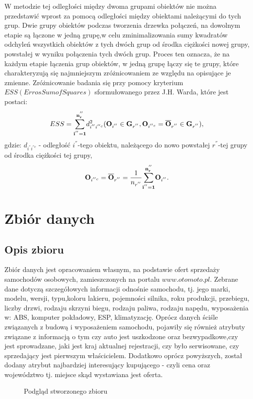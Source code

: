 \documentclass[12pt,a4paper]{report}
\begin{document}
W metodzie tej odległości między dwoma grupami obiektów nie można przedstawić wprost za pomocą odległości między obiektami należącymi do tych grup. Dwie grupy obiektów podczas tworzenia drzewka połączeń, na dowolnym etapie są łączone w jedną grupę,w celu zminimalizowania sumy kwadratów odchyleń wszystkich obiektów z tych dwóch grup od środka ciężkości nowej grupy, powstałej w wyniku połączenia tych dwóch grup. Proces ten oznacza, że na każdym etapie łączenia grup obiektów, w jedną grupę łączy się te grupy, które charakteryzują się najmniejszym zróżnicowaniem ze względu na opisujące je zmienne. Zróżnicowanie badania się przy pomocy kryterium $ESS (Erros Sum of Squares)$ sformułowanego przez J.H. Warda, które jest postaci:
\begin{equation}
ESS= \bold{\sum_{i^{''}=1}^{n_r^{''}}} d_{i^{''}i^{''c}}^2 ( \bold{O}_{i^{''}} \in \bold{G}_{r^{''}}, \bold{O}_{i^{''c}}=\bold{\overline{O}}_{r^{''}} \in \bold{G}_{r^{''}} ),
\end{equation} 
gdzie:
$d_{i^{''}i^{''c}}$ - odległość $i^{''}$-tego obiektu, należącego do nowo powstałej $r^{''}$-tej grupy od środka ciężkości tej grupy,\\
\begin{equation}
\bold{O}_{i^{''c}} = \bold{\overline{O}}_{r^{''}}=\frac{1}{n_{r^{''}}} \bold{\sum_{i^{''}=1}^{n_r^{''}}} \bold{O}_{i^{''}}.
\end{equation}

\newpage
\chapter{Zbiór danych}

\section{Opis zbioru}
\noindent
Zbiór danych jest opracowaniem własnym, na podstawie ofert sprzedaży samochodów osobowych, zamieszczonych na portalu $www.otomoto.pl$. Zebrane dane dotyczą szczegółowych informacji odnośnie samochodu, tj. jego marki, modelu, wersji, typu,koloru lakieru, pojemności silnika, roku produkcji, przebiegu, liczby drzwi, rodzaju skrzyni biegu, rodzaju paliwa, rodzaju napędu, wyposażenia w: ABS, komputer pokładowy, ESP, klimatyzację. Oprócz danych ściśle związanych z budową i wyposażeniem samochodu, pojawiły się również atrybuty związane z informacją o tym czy auto jest uszkodzone oraz bezwypadkowe,czy jest sprowadzane, jaki jest kraj aktualnej rejestracji, czy było serwisowane, czy sprzedający jest pierwszym właścicielem. Dodatkowo oprócz powyższych, został dodany atrybut najbardziej interesujący kupującego - czyli cena oraz województwo tj. miejsce skąd wystawiana jest oferta.
\begin{figure}[h]
\centering
\caption{Podgląd stworzonego zbioru}
\label{fig:obrazek1}
\end{figure}
\end{document}
